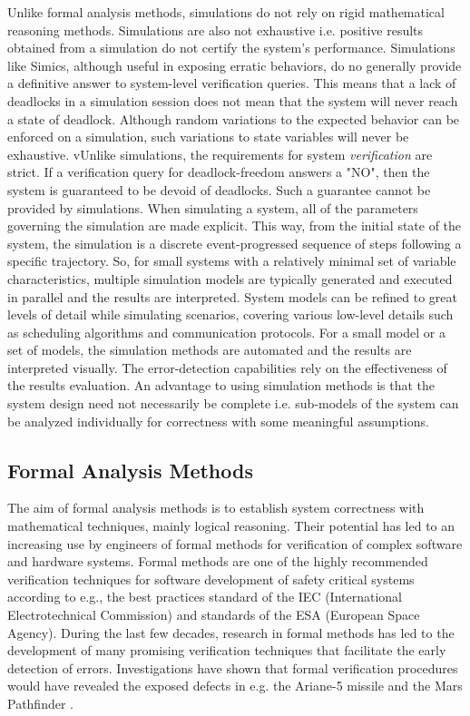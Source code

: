 Unlike formal analysis methods, simulations do not rely on rigid mathematical reasoning methods. Simulations are also not exhaustive i.e. positive results obtained from a simulation do not certify the system's performance. Simulations like Simics, although useful in exposing erratic behaviors, do no generally provide a definitive answer to system-level verification queries. This means that a lack of deadlocks in a simulation session does not mean that the system will never reach a state of deadlock. Although random variations to the expected behavior can be enforced on a simulation, such variations to state variables will never be exhaustive. vUnlike simulations, the requirements for system \emph{verification} are strict. If a verification query for deadlock-freedom answers a "NO", then the system is guaranteed to be devoid of deadlocks. Such a guarantee cannot be provided by simulations. When simulating a system, all of the parameters governing the simulation are made explicit. This way, from the initial state of the system, the simulation is a discrete event-progressed sequence of steps following a specific trajectory. So, for small systems with a relatively minimal set of variable characteristics, multiple simulation models are typically generated and executed in parallel and the results are interpreted. System models can be refined to great levels of detail while simulating scenarios, covering various low-level details such as scheduling algorithms and communication protocols. For a small model or a set of models, the simulation methods are automated and the results are interpreted visually. The error-detection capabilities rely on the effectiveness of the results evaluation. An advantage to using simulation methods is that the system design need not necessarily be complete i.e. sub-models of the system can be analyzed individually for correctness with some meaningful assumptions.

\subsection{Formal Analysis Methods}

The aim of formal analysis methods is to establish system correctness with mathematical techniques, mainly logical reasoning. Their potential has led to an increasing use by engineers of formal methods for verification of complex software and hardware systems. Formal methods are one of the highly recommended verification techniques for software development of safety critical systems according to e.g., the best practices standard of the IEC (International Electrotechnical Commission) and standards of the ESA (European Space Agency). During the last few decades, research in formal methods has led to the development of many promising verification techniques that facilitate the early detection of errors. Investigations have shown that formal verification procedures would have revealed the exposed defects in e.g. the Ariane-5 missile \cite{lions1996ariane} and the Mars Pathfinder \cite{jones1997really, morrison1996board}. 

